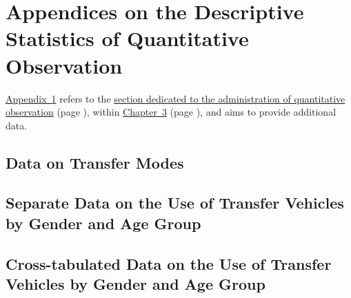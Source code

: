     \setcounter{section}{0}
\chapter{Appendices on the Descriptive Statistics of Quantitative Observation}
    \label{annexes:observation}

\hyperref[annexes:observation]{Appendix~\ref{annexes:observation}} refers to the \hyperref[chap3:observation-quantitative]{section dedicated to the administration of quantitative observation} (page \pageref{chap3:observation-quantitative}), within \hyperref[chap3:titre]{Chapter~3} (page \pageref{chap3:titre}), and aims to provide additional data.%

    \setcounter{tocdepth}{2}
    \renewcommand{\localcontentsname}{Structure of Appendix~\ref{annexes:observation}}
\localtableofcontents

    \newpage
\section{Data on Transfer Modes}
    \label{annexes:observation-modes}


\section{Separate Data on the Use of Transfer Vehicles by Gender and Age Group}
    \label{annexes:observation-genre-age-separes}


\section{Cross-tabulated Data on the Use of Transfer Vehicles by Gender and Age Group}
    \label{annexes:observation-genre-age-croises}

